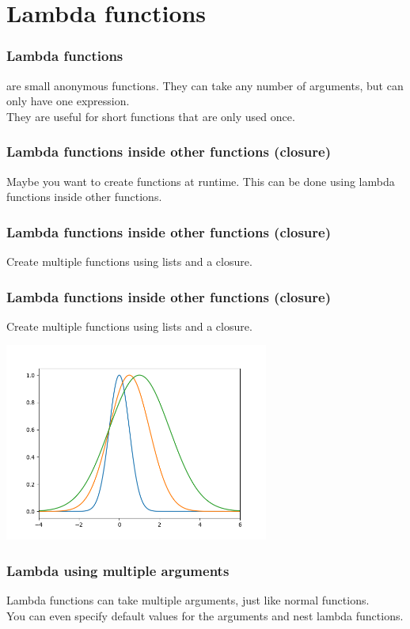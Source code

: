 \documentclass{beamer}
\begin{document}
\section{Lambda functions}
\begin{frame}
  \frametitle{Lambda functions}
   are small anonymous functions. They can take any number of arguments, but can only have one expression. \\They are useful for short functions that are only used once.\\
  
\end{frame}
\begin{frame}
  \frametitle{Lambda functions inside other functions (closure)}
  Maybe you want to create functions at runtime. This can be done using lambda functions inside other functions.\\
  
\end{frame}
\begin{frame}
  \frametitle{Lambda functions inside other functions (closure)}
  Create multiple functions using lists and a closure.\\
  
\end{frame}
\begin{frame}
  \frametitle{Lambda functions inside other functions (closure)}
  Create multiple functions using lists and a closure.\\
  \begin{center}
    \includegraphics[width=0.65\textwidth]{examples/fig/lambda2.png}
  \end{center}
\end{frame}
\begin{frame}
  \frametitle{Lambda using multiple arguments}
  Lambda functions can take multiple arguments, just like normal functions.\\
  
  You can even specify default values for the arguments and nest lambda functions.
\end{frame}
\end{document}
